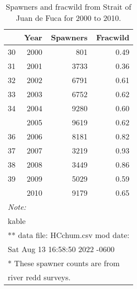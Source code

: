 \documentclass[
  letterpaper,
  oneside]{scrbook}
\begin{document}
\hypertarget{tbl-appB1}{}
\begin{table}
\caption{\label{tbl-appB1}Spawners and fracwild from Strait of Juan de Fuca for 2000 to 2010. }\tabularnewline

\centering
\begin{tabular}[t]{lrrr}
\toprule
  & Year & Spawners & Fracwild\\
\midrule
30 & 2000 & 801 & 0.49\\
31 & 2001 & 3733 & 0.36\\
32 & 2002 & 6791 & 0.61\\
33 & 2003 & 6752 & 0.62\\
34 & 2004 & 9280 & 0.60\\
\addlinespace
35 & 2005 & 9619 & 0.62\\
36 & 2006 & 8181 & 0.82\\
37 & 2007 & 3219 & 0.93\\
38 & 2008 & 3449 & 0.86\\
39 & 2009 & 5029 & 0.59\\
\addlinespace
40 & 2010 & 9179 & 0.65\\
\bottomrule
\multicolumn{4}{l}{\rule{0pt}{1em}\textit{Note: }}\\
\multicolumn{4}{l}{\rule{0pt}{1em}kable}\\
\multicolumn{4}{l}{\textsuperscript{} ** data file: HCchum.csv mod date:}\\
\multicolumn{4}{l}{Sat Aug 13 16:58:50 2022 -0600}\\
\multicolumn{4}{l}{\textsuperscript{} * These spawner counts are from}\\
\multicolumn{4}{l}{river redd surveys.}\\
\end{tabular}
\end{table}

\newpage
\end{document}
